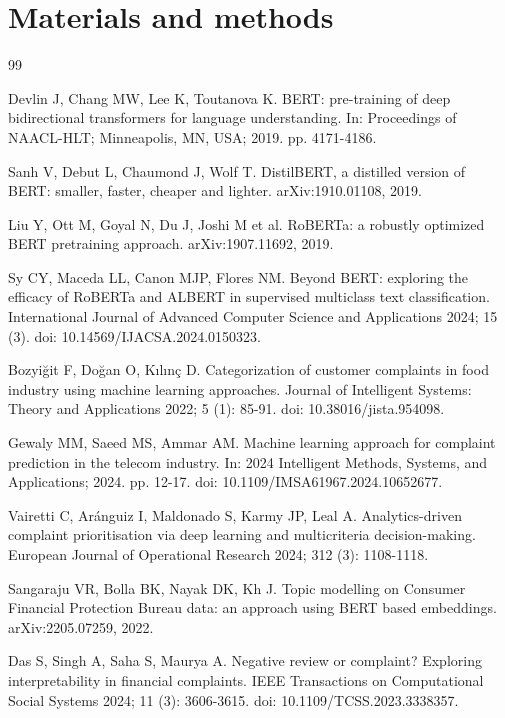 \documentclass{elektr}
\begin{document}
\section{Materials and methods}
\begin{thebibliography}{99}
\setlength{\itemsep}{1pt}
\setlength{\parsep}{0pt}

 Devlin J, Chang MW, Lee K, Toutanova K. BERT: pre-training of deep bidirectional transformers for language understanding. In: Proceedings of NAACL-HLT; Minneapolis, MN, USA; 2019. pp. 4171-4186.

 Sanh V, Debut L, Chaumond J, Wolf T. DistilBERT, a distilled version of BERT: smaller, faster, cheaper and lighter. arXiv:1910.01108, 2019.

 Liu Y, Ott M, Goyal N, Du J, Joshi M et al. RoBERTa: a robustly optimized BERT pretraining approach. arXiv:1907.11692, 2019.

 Sy CY, Maceda LL, Canon MJP, Flores NM. Beyond BERT: exploring the efficacy of RoBERTa and ALBERT in supervised multiclass text classification. International Journal of Advanced Computer Science and Applications 2024; 15 (3). doi: 10.14569/IJACSA.2024.0150323.

 Bozyiğit F, Doğan O, Kılınç D. Categorization of customer complaints in food industry using machine learning approaches. Journal of Intelligent Systems: Theory and Applications 2022; 5 (1): 85-91. doi: 10.38016/jista.954098.

 Gewaly MM, Saeed MS, Ammar AM. Machine learning approach for complaint prediction in the telecom industry. In: 2024 Intelligent Methods, Systems, and Applications; 2024. pp. 12-17. doi: 10.1109/IMSA61967.2024.10652677.

 Vairetti C, Aránguiz I, Maldonado S, Karmy JP, Leal A. Analytics-driven complaint prioritisation via deep learning and multicriteria decision-making. European Journal of Operational Research 2024; 312 (3): 1108-1118.

 Sangaraju VR, Bolla BK, Nayak DK, Kh J. Topic modelling on Consumer Financial Protection Bureau data: an approach using BERT based embeddings. arXiv:2205.07259, 2022.

 Das S, Singh A, Saha S, Maurya A. Negative review or complaint? Exploring interpretability in financial complaints. IEEE Transactions on Computational Social Systems 2024; 11 (3): 3606-3615. doi: 10.1109/TCSS.2023.3338357.


\end{thebibliography}
\end{document}
